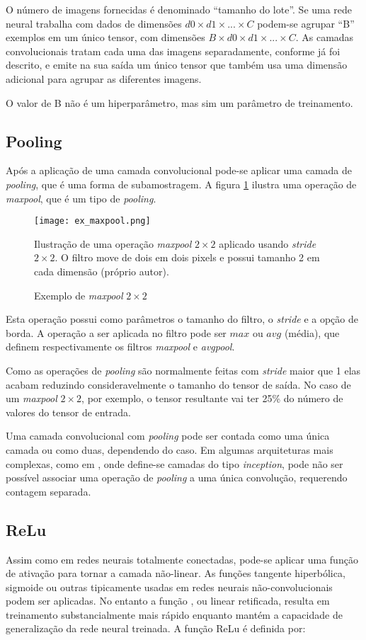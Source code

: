 O número de imagens fornecidas é denominado ``tamanho do lote''. Se uma rede
neural trabalha com dados de dimensões $d0 \times d1 \times ... \times C$
podem-se agrupar “B” exemplos em
um único tensor, com dimensões $B \times d0 \times d1 \times ... \times C$.
As camadas convolucionais tratam cada uma das imagens separadamente,
conforme já foi descrito, e emite na sua saída um
único tensor que também usa uma dimensão adicional para agrupar as diferentes
imagens.

O valor de B não é um hiperparâmetro, mas sim um parâmetro de treinamento.

\subsection{Pooling}
Após a aplicação de uma camada convolucional pode-se aplicar uma camada de
\emph{pooling}, que é uma forma de subamostragem. A figura
\ref{fig:ex_maxpool} ilustra uma operação de \emph{maxpool}, que é um tipo de
\emph{pooling}.

\begin{figure}[!htb]
	\centering
	\texttt{[image: ex\_maxpool.png]}
	\caption{Exemplo de \emph{maxpool} $2 \times 2$}
	\label{fig:ex_maxpool}
	Ilustração de uma operação \emph{maxpool} $2 \times 2$ aplicado usando
	\emph{stride} $2 \times 2$. O filtro move de dois em dois pixels e possui
	tamanho 2 em cada dimensão (próprio autor).
\end{figure}

Esta operação possui como parâmetros o tamanho do filtro, o \emph{stride} e
a opção de
borda. A operação a ser aplicada no filtro pode ser $max$ ou $avg$ (média),
que definem respectivamente os filtros \emph{maxpool} e \emph{avgpool}.

Como as operações de \emph{pooling} são normalmente feitas com \emph{stride}
maior que 1 elas
acabam reduzindo consideravelmente o tamanho do tensor de saída. No caso de um
\emph{maxpool} $2 \times 2$, por exemplo, o tensor resultante vai ter 25\% do
número de valores do tensor de entrada.

Uma camada convolucional com \emph{pooling} pode ser contada como uma única
camada ou
como duas, dependendo do caso. Em algumas arquiteturas mais complexas, como em
\cite{szegedy2015going}, onde define-se camadas do tipo \emph{inception},
pode não ser possível associar uma operação de \emph{pooling} a uma única
convolução, requerendo contagem separada.

\subsection{ReLu}
Assim como em redes neurais totalmente conectadas, pode-se aplicar uma função
de ativação para tornar a camada não-linear. As funções tangente
hiperbólica, sigmoide ou outras tipicamente usadas em redes neurais
não-convolucionais podem ser aplicadas. No entanto a função
, ou
linear retificada, resulta em treinamento substancialmente mais rápido enquanto
mantém a capacidade de generalização da rede neural treinada. A função
ReLu é definida por:



